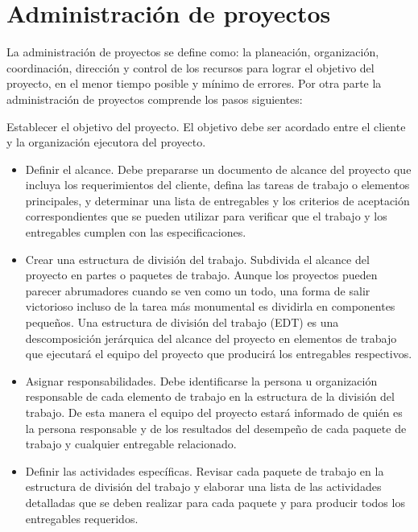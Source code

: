 \section{Administración de proyectos}
La administración de proyectos se define como: la planeación, organización, coordinación, dirección y control de los recursos para lograr el objetivo del proyecto, en el menor tiempo posible y mínimo de errores. \cite{J. Gido P.}\cite{PMBOK}\cite{Adproyectos}Por otra parte la administración de proyectos comprende los pasos siguientes:

Establecer el objetivo del proyecto. El objetivo debe ser acordado entre el cliente y la organización ejecutora del proyecto. 
\begin{itemize}
 

\item Definir el alcance. Debe prepararse un documento de alcance del proyecto que incluya los requerimientos del cliente, defina las tareas de trabajo o elementos principales, y determinar una lista de entregables y los criterios de aceptación correspondientes que se pueden utilizar para verificar que el trabajo y los entregables cumplen con las especificaciones. 

 

\item  Crear una estructura de división del trabajo. Subdivida el alcance del proyecto en partes o paquetes de trabajo. Aunque los proyectos pueden parecer abrumadores cuando se ven como un todo, una forma de salir victorioso incluso de la tarea más monumental es dividirla en componentes pequeños. Una estructura de división del trabajo (EDT) es una descomposición jerárquica del alcance del proyecto en elementos de trabajo que ejecutará el equipo del proyecto que producirá los entregables respectivos.  

 

\item Asignar responsabilidades. Debe identificarse la persona u organización responsable de cada elemento de trabajo en la estructura de la división del trabajo. De esta manera el equipo del proyecto estará informado de quién es la persona responsable y de los resultados del desempeño de cada paquete de trabajo y cualquier entregable relacionado.  

 

\item Definir las actividades específicas. Revisar cada paquete de trabajo en la estructura de división del trabajo y elaborar una lista de las actividades detalladas que se deben realizar para cada paquete y para producir todos los entregables requeridos. 


\end{itemize}
